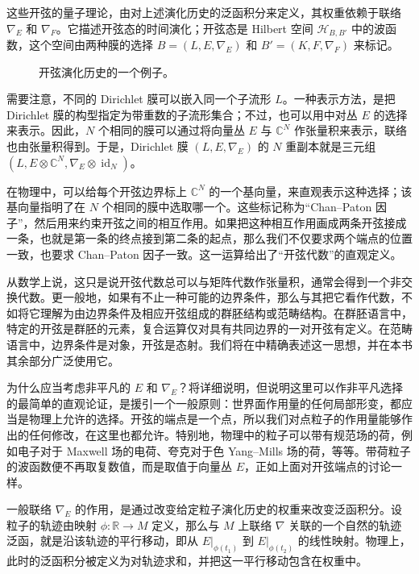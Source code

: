 这些开弦的量子理论，由对上述演化历史的泛函积分来定义，其权重依赖于联络 $\nabla_E$ 和 $\nabla_F$。它描述开弦态的时间演化；开弦态是 Hilbert 空间 $\mathcal{H}_{B,B'}$ 中的波函数，这个空间由两种膜的选择 $B=(L,E,\nabla_E)$ 和 $B'=(K,F,\nabla_F)$ 来标记。

\begin{figure}[H]
\centering
{}
\caption{开弦演化历史的一个例子。}\label{fig:1.2}
\end{figure}

需要注意，不同的 Dirichlet 膜可以嵌入同一个子流形 $L$。一种表示方法，是把 Dirichlet 膜的构型指定为带重数的子流形集合；不过，也可以用中对丛 $E$ 的选择来表示。因此，$N$ 个相同的膜可以通过将向量丛 $E$ 与 $\mathbb{C}^N$ 作张量积来表示，联络也由张量积得到。于是，Dirichlet 膜 $(L,E,\nabla_E)$ 的 $N$ 重副本就是三元组 $(L,E\otimes\mathbb{C}^N,\nabla_E\otimes\operatorname{id}_N)$。

在物理中，可以给每个开弦边界标上 $\mathbb{C}^N$ 的一个基向量，来直观表示这种选择；该基向量指明了在 $N$ 个相同的膜中选取哪一个。这些标记称为“Chan--Paton 因子”，然后用来约束开弦之间的相互作用。如果把这种相互作用画成两条开弦接成一条，也就是第一条的终点接到第二条的起点，那么我们不仅要求两个端点的位置一致，也要求 Chan--Paton 因子一致。这一运算给出了“开弦代数”的直观定义。

从数学上说，这只是说开弦代数总可以与矩阵代数作张量积，通常会得到一个非交换代数。更一般地，如果有不止一种可能的边界条件，那么与其把它看作代数，不如将它理解为由边界条件及相应开弦组成的群胚结构或范畴结构。在群胚语言中，特定的开弦是群胚的元素，复合运算仅对具有共同边界的一对开弦有定义。在范畴语言中，边界条件是对象，开弦是态射。我们将在中精确表述这一思想，并在本书其余部分广泛使用它。

为什么应当考虑非平凡的 $E$ 和 $\nabla_E$？将详细说明，但说明这里可以作非平凡选择的最简单的直观论证，是援引一个一般原则：世界面作用量的任何局部形变，都应当是物理上允许的选择。开弦的端点是一个点，所以我们对点粒子的作用量能够作出的任何修改，在这里也都允许。特别地，物理中的粒子可以带有规范场的荷，例如电子对于 Maxwell 场的电荷、夸克对于色 Yang--Mills 场的荷，等等。带荷粒子的波函数便不再取复数值，而是取值于向量丛 $E$，正如上面对开弦端点的讨论一样。

一般联络 $\nabla_E$ 的作用，是通过改变给定粒子演化历史的权重来改变泛函积分。设粒子的轨迹由映射 $\phi\colon\mathbb{R}\to M$ 定义，那么与 $M$ 上联络 $\nabla$ 关联的一个自然的轨迹泛函，就是沿该轨迹的平行移动，即从 $E|_{\phi(t_1)}$ 到 $E|_{\phi(t_2)}$ 的线性映射。物理上，此时的泛函积分被定义为对轨迹求和，并把这一平行移动包含在权重中。


